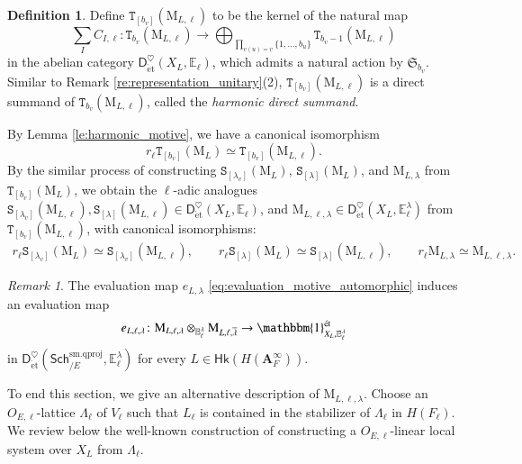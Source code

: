 \documentclass[12pt]{amsart}
\numberwithin{equation}{section}
\theoremstyle{plain}
\theoremstyle{definition}
\newtheorem{definition}[proposition]{Definition}
\theoremstyle{remark}
\newtheorem{remark}[proposition]{Remark}
\renewcommand{\b}[1]{\mathbf{#1}}
\renewcommand{\d}[1]{\mathbb{#1}}
\newcommand{\f}[1]{\mathfrak{#1}}
\renewcommand{\r}[1]{\mathrm{#1}}
\renewcommand{\sf}[1]{\mathsf{#1}}
\renewcommand{\(}{\left(}
\renewcommand{\)}{\right)}
\newcommand{\ol}[1]{\overline{#1}{}}
\newcommand{\bA}{\b A}
\newcommand{\dE}{\d E}
\newcommand{\fS}{\f S}
\newcommand{\rM}{\r M}
\newcommand{\sfD}{\sf D}
\newcommand{\tS}{\mathtt{S}}
\newcommand{\tT}{\mathtt{T}}
\newcommand{\et}{{\acute{\r{e}}\r{t}}}
\newcommand{\smq}{\r{sm.qproj}}
\newcommand{\Sch}{\sf{Sch}}
\newcommand{\Hk}{\sf{Hk}}
\begin{document}
\begin{definition}\label{de:harmonic_etale}
Define $\tT_{[b_v]}(\rM_{L,\ell})$ to be the kernel of the natural map
\[
\sum_{I}C_{I,\ell}\colon \tT_{b_v}(\rM_{L,\ell})\to\bigoplus_{\prod_{v(u)=v}\{1,\dots,b_u\}}\tT_{b_v-1}(\rM_{L,\ell})
\]
in the abelian category $\sfD_{\et}^\heartsuit(X_L,\dE_\ell)$, which admits a natural action by $\fS_{b_v}$. Similar to Remark \ref{re:representation_unitary}(2), $\tT_{[b_v]}(\rM_{L,\ell})$ is a direct summand of $\tT_{b_v}(\rM_{L,\ell})$, called the \emph{harmonic direct summand}.
\end{definition}

By Lemma \ref{le:harmonic_motive}, we have a canonical isomorphism
\[
r_\ell\tT_{[b_v]}(\rM_L)\simeq\tT_{[b_v]}(\rM_{L,\ell}).
\]
By the similar process of constructing $\tS_{[\lambda_v]}(\rM_L)$, $\tS_{[\lambda]}(\rM_L)$, and $\rM_{L,\lambda}$ from $\tT_{[b_v]}(\rM_L)$, we obtain the $\ell$-adic analogues $\tS_{[\lambda_v]}(\rM_{L,\ell}),\tS_{[\lambda]}(\rM_{L,\ell})\in\sfD_{\et}^\heartsuit(X_L,\dE_\ell)$, and $\rM_{L,\ell,\lambda}\in\sfD_{\et}^\heartsuit(X_L,\dE^\lambda_\ell)$ from $\tT_{[b_v]}(\rM_{L,\ell})$, with canonical isomorphisms:
\begin{align}\label{eq:realization_etale}
r_\ell\tS_{[\lambda_v]}(\rM_L)\simeq\tS_{[\lambda_v]}(\rM_{L,\ell}),\qquad
r_\ell\tS_{[\lambda]}(\rM_L)\simeq\tS_{[\lambda]}(\rM_{L,\ell}),\qquad
r_\ell\rM_{L,\lambda}\simeq\rM_{L,\ell,\lambda}.
\end{align}

\begin{remark}
The evaluation map $e_{L,\lambda}$ \eqref{eq:evaluation_motive_automorphic} induces an evaluation map
\begin{align}\label{eq:evaluation_etale_automorphic}
e_{L,\ell,\lambda}\colon\rM_{L,\ell,\lambda}\otimes_{\dE^\lambda_\ell}\rM_{L,\ell,\ol\lambda}
\to\mathbbm{1}^{\et}_{X_L,\dE^\lambda_\ell}
\end{align}
in $\sfD_{\et}^\heartsuit(\Sch^\smq_{/E},\dE^\lambda_\ell)$ for every $L\in\Hk(H(\bA_F^\infty))$.
\end{remark}


To end this section, we give an alternative description of $\rM_{L,\ell,\lambda}$. Choose an $O_{E,\ell}$-lattice $\Lambda_\ell$ of $V_\ell$ such that $L_\ell$ is contained in the stabilizer of $\Lambda_\ell$ in $H(F_\ell)$. We review below the well-known construction of constructing a $O_{E,\ell}$-linear local system over $X_L$ from $\Lambda_\ell$.
\end{document}
